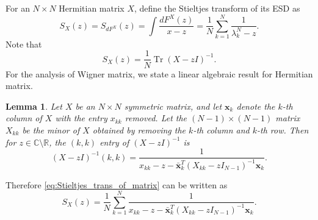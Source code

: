 \documentclass[11pt, a4paper]{article}
\numberwithin{equation}{section}
\newcommand{\compC}{\mathbb{C}}
\newcommand{\realR}{\mathbb{R}}
\renewcommand{\vec}[1]{\mathbf{#1}}
\DeclareMathOperator{\Tr}{Tr}
\newtheorem{lem}{Lemma}
\theoremstyle{definition}
\theoremstyle{remark}
\begin{document}
For an $N \times N$ Hermitian matrix $X$, define the Stieltjes transform of its ESD as
\begin{equation}
  S_X(z) = S_{dF^X}(z) = \int \frac{dF^X(z)}{x - z} = \frac{1}{N} \sum^N_{k = 1} \frac{1}{\lambda^N_k - z}.
\end{equation}
Note that
\begin{equation} \label{eq:Stieltjes_trans_of_matrix}
  S_X(z) = \frac{1}{N} \Tr(X - zI)^{-1}.
\end{equation}
For the analysis of Wigner matrix, we state a linear algebraic result for Hermitian matrix.
\begin{lem} \label{lem:trick_for_Stieltjes}
  Let $X$ be an $N \times N$ symmetric matrix, and let $\vec{x}_k$ denote the $k$-th column of $X$ with the entry $x_{kk}$ removed. Let the $(N - 1) \times (N - 1)$ matrix $X_{kk}$ be the minor of $X$ obtained by removing the $k$-th column and $k$-th row. Then for $z \in \compC \setminus \realR$, the $(k, k)$ entry of $(X - zI)^{-1}$ is
  \begin{equation} \label{eq:trick_for_Stieltjes}
    (X - zI)^{-1}(k, k) = \frac{1}{x_{kk} - z - \bar{\vec{x}}^T_k (X_{kk} - z I_{N - 1})^{-1} \vec{x}_k}.
  \end{equation}
\end{lem}
Therefore \eqref{eq:Stieltjes_trans_of_matrix} can be written as
\begin{equation} \label{eq:Stieltjes_for_matrix}
  S_X(z) = \frac{1}{N} \sum^N_{k = 1} \frac{1}{x_{kk} - z - \bar{\vec{x}}^T_k (X_{kk} - z I_{N - 1})^{-1} \vec{x}_k}.
\end{equation}
\end{document}
